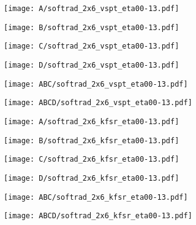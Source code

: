 \documentclass[landscape,10pt]{beamer} %
\begin{document}
\newpage
\begin{figure}[p]
\centering
  \texttt{[image: A/softrad\_2x6\_vspt\_eta00-13.pdf]}
\end{figure}
\newpage
\begin{figure}[p]
\centering
  \texttt{[image: B/softrad\_2x6\_vspt\_eta00-13.pdf]}
\end{figure}
\newpage
\begin{figure}[p]
\centering
  \texttt{[image: C/softrad\_2x6\_vspt\_eta00-13.pdf]}
\end{figure}
\newpage
\begin{figure}[p]
\centering
  \texttt{[image: D/softrad\_2x6\_vspt\_eta00-13.pdf]}
\end{figure}
\newpage
\begin{figure}[p]
\centering
  \texttt{[image: ABC/softrad\_2x6\_vspt\_eta00-13.pdf]}
\end{figure}
\newpage
\begin{figure}[p]
\centering
  \texttt{[image: ABCD/softrad\_2x6\_vspt\_eta00-13.pdf]}
\end{figure}

\newpage
\begin{figure}[p]
\centering
  \texttt{[image: A/softrad\_2x6\_kfsr\_eta00-13.pdf]}
\end{figure}
\newpage
\begin{figure}[p]
\centering
  \texttt{[image: B/softrad\_2x6\_kfsr\_eta00-13.pdf]}
\end{figure}
\newpage
\begin{figure}[p]
\centering
  \texttt{[image: C/softrad\_2x6\_kfsr\_eta00-13.pdf]}
\end{figure}
\newpage
\begin{figure}[p]
\centering
  \texttt{[image: D/softrad\_2x6\_kfsr\_eta00-13.pdf]}
\end{figure}
\newpage
\begin{figure}[p]
\centering
  \texttt{[image: ABC/softrad\_2x6\_kfsr\_eta00-13.pdf]}
\end{figure}
\newpage
\begin{figure}[p]
\centering
  \texttt{[image: ABCD/softrad\_2x6\_kfsr\_eta00-13.pdf]}
\end{figure}

\newpage
\end{document}
